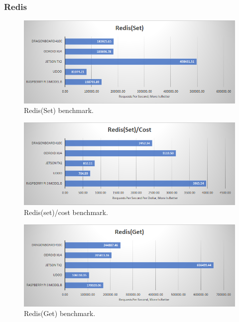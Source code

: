 \documentclass[english]{book_template} %
\begin{document}
\subsubsection{Redis}

\begin{figure}[H]
\center
\caption{Redis(Set) benchmark.\label{fig:redisSet}}
\includegraphics[scale=1]{./resultphoronix/redisSet.png}
\end{figure}

\begin{figure}[H]
\center
\caption{Redis(set)/cost benchmark.\label{fig:redisSet_cost}}
\includegraphics[scale=1]{./resultphoronix/redisSet_cost.png}
\end{figure}

\begin{figure}[H]
\center
\caption{Redis(Get) benchmark.\label{fig:redisGet}}
\includegraphics[scale=1]{./resultphoronix/redisGet.png}
\end{figure}
\end{document}
